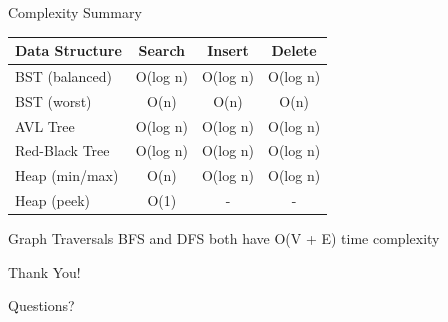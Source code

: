 \documentclass[aspectratio=169,xcolor=dvipsnames]{beamer}
\begin{document}
\begin{frame}{Complexity Summary}
  \begin{table}
    \centering
    \small
    \begin{tabular}{l|c|c|c}
      \toprule
      \textbf{Data Structure} & \textbf{Search} & \textbf{Insert} & \textbf{Delete} \\
      \midrule
      BST (balanced) & O(log n) & O(log n) & O(log n) \\
      BST (worst) & O(n) & O(n) & O(n) \\
      AVL Tree & O(log n) & O(log n) & O(log n) \\
      Red-Black Tree & O(log n) & O(log n) & O(log n) \\
      Heap (min/max) & O(n) & O(log n) & O(log n) \\
      Heap (peek) & O(1) & - & - \\
      \bottomrule
    \end{tabular}
  \end{table}

  \vspace{0.3cm}

  \begin{alertblock}{Graph Traversals}
    BFS and DFS both have O(V + E) time complexity
  \end{alertblock}
\end{frame}

\begin{frame}[plain]
  \begin{center}
    {\Huge Thank You!}

    \vspace{1cm}

    {\large Questions?}
  \end{center}
\end{frame}
\end{document}

